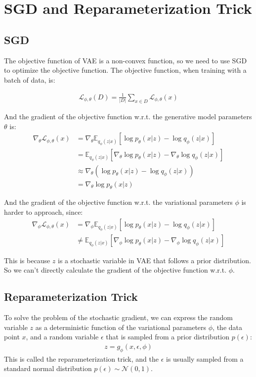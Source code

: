 \documentclass[11pt]{article}
\theoremstyle{definition}
\begin{document}
\section{SGD and Reparameterization Trick}

\subsection{SGD}

The objective function of VAE is a non-convex function, so we need to use SGD to optimize the objective function. The objective function, when training with a batch of data, is:

\begin{align}
    \mathcal{L}_{\phi, \theta}(D) = \frac{1}{|D|}\sum_{x \in D} \mathcal{L}_{\phi, \theta}(x)
\end{align}

And the gradient of the objective function w.r.t. the generative model parameters $\theta$ is:
\begin{align}
    \nabla_\theta \mathcal{L}_{\phi, \theta}(x) &= \nabla_\theta\mathbb{E}_{q_\phi(z|x)}[\log p_\theta(x|z) - \log q_\phi(z|x)]\\
    &= \mathbb{E}_{q_\phi(z|x)}[\nabla_\theta\log p_\theta(x|z) - \nabla_\theta\log q_\phi(z|x)]\\
    &\approx \nabla_\theta(\log p_\theta(x|z) - \log q_\phi(z|x))\\
    &= \nabla_\theta\log p_\theta(x|z)
\end{align}

And the gradient of the objective function w.r.t. the variational parameters $\phi$ is harder to approach, since:
\begin{align}
    \nabla_\phi \mathcal{L}_{\phi, \theta}(x) &= \nabla_\phi\mathbb{E}_{q_\phi(z|x)}[\log p_\theta(x|z) - \log q_\phi(z|x)]\\
    &\neq \mathbb{E}_{q_\phi(z|x)}[\nabla_\phi\log p_\theta(x|z) - \nabla_\phi\log q_\phi(z|x)]
\end{align}

This is because $z$ is a stochastic variable in VAE that follows a prior distribution. So we can't directly calculate the gradient of the objective function w.r.t. $\phi$.

\subsection{Reparameterization Trick}

To solve the problem of the stochastic gradient, we can express the random variable $z$ as a deterministic function of the variational parameters $\phi$, the data point $x$, and a random variable $\epsilon$ that is sampled from a prior distribution $p(\epsilon)$:
\begin{align}
    z=g_\phi(x, \epsilon, \phi)
\end{align}
This is called the reparameterization trick, and the $\epsilon$ is usually sampled from a standard normal distribution $p(\epsilon) \sim \mathcal{N}(0, 1)$.
\end{document}
